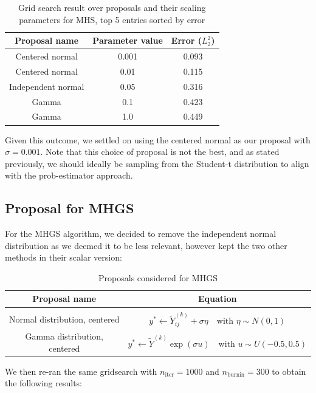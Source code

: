 \documentclass[12pt]{memoir}
\newcommand{\nitern}[1]{$n_{\text{iter}}=#1$}
\newcommand{\nburninn}[1]{$n_{\text{burnin}}=#1$}
\begin{document}
\begin{table}[H]

    \begin{center}
        \begin{tabular}{|c|c|c|}
            \hline
            Proposal name & Parameter value & Error ($L_2^2$)\\
            \hline\hline
            Centered normal& 0.001 & 0.093\\
            Centered normal&0.01  &0.115\\
            Independent normal& 0.05 &0.316\\
            Gamma&0.1  &0.423\\
            Gamma&1.0   &0.449\\\hline
        \end{tabular}
\end{center}
\caption{Grid search result over proposals and their scaling parameters for MHS, top 5 entries sorted by error}
\label{table:proposal-grid-search-mhs}
\end{table}
Given this outcome, we settled on using the centered normal as our proposal with $\sigma=0.001$. Note that this choice of proposal is not the best, and as stated previously, we should ideally be sampling from the Student-t distribution to align with the prob-estimator approach. 

\subsection*{Proposal for MHGS}
For the MHGS algorithm, we decided to remove the independent normal distribution as we deemed it to be less relevant, however kept the two other methods in their scalar version:

\begin{table}[H]

    \begin{center}
        \begin{tabular}{|c|c|}
            \hline
            Proposal name & Equation\\
            \hline\hline
             & \\[-10pt]
            Normal distribution, centered & $y^* \gets \tilde Y^{(k)}_{ij} + \sigma {\eta} \quad\text{with } \eta \sim N(0,1)$\\
            Gamma distribution, centered & $y^* \gets \tilde Y^{(k)} \exp (\sigma u)\quad \text{with } {u} \sim U(-0.5, 0.5)$\\\hline
        \end{tabular}
\end{center}
\caption{Proposals considered for MHGS}
\label{table:proposal-comp-mhgs}
\end{table}
We then re-ran the same gridsearch with \nitern{1000} and \nburninn{300} to obtain the following results: 
\end{document}
